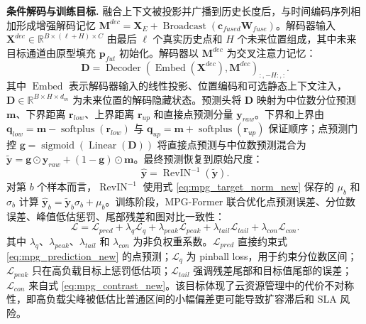\documentclass[UTF8]{ctexart}
\begin{document}
\noindent\textbf{条件解码与训练目标.}
融合上下文被投影并广播到历史长度后，与时间编码序列相加形成增强解码记忆 $\mathbf M^{dec}=\mathbf X_E+\operatorname{Broadcast}(\mathbf c_{fused}\mathbf W_{fuse})$。解码器输入 $\mathbf X^{dec}\in\mathbb R^{B\times(\ell+H)\times C}$ 由最后 $\ell$ 个真实历史点和 $H$ 个未来位置组成，其中未来目标通道由原型填充 $\mathbf p_{fut}$ 初始化。解码器以 $\mathbf M^{dec}$ 为交叉注意力记忆：
\begin{equation}
    \mathbf D=\operatorname{Decoder}(\operatorname{Embed}(\mathbf X^{dec}),\mathbf M^{dec})_{:,-H:,:}.
    \label{eq:mpg_decoder_new}
\end{equation}
其中 $\operatorname{Embed}$ 表示解码器输入的线性投影、位置编码和可选静态上下文注入，$\mathbf D\in\mathbb R^{B\times H\times d_m}$ 为未来位置的解码隐藏状态。预测头将 $\mathbf D$ 映射为中位数分位预测 $\mathbf m$、下界距离 $\mathbf r_{low}$、上界距离 $\mathbf r_{up}$ 和直接点预测分量 $\mathbf y_{raw}$。下界和上界由 $\mathbf q_{low}=\mathbf m-\operatorname{softplus}(\mathbf r_{low})$ 与 $\mathbf q_{up}=\mathbf m+\operatorname{softplus}(\mathbf r_{up})$ 保证顺序；点预测门控 $\mathbf g=\operatorname{sigmoid}(\operatorname{Linear}(\mathbf D))$ 将直接点预测与中位数预测混合为 $\tilde{\mathbf y}=\mathbf g\odot\mathbf y_{raw}+(1-\mathbf g)\odot\mathbf m$。最终预测恢复到原始尺度：
\begin{equation}
    \hat{\mathbf y}=\operatorname{RevIN}^{-1}(\tilde{\mathbf y}).
    \label{eq:mpg_prediction_new}
\end{equation}
对第 $b$ 个样本而言，$\operatorname{RevIN}^{-1}$ 使用式 \eqref{eq:mpg_target_norm_new} 保存的 $\mu_b$ 和 $\sigma_b$ 计算 $\hat{\mathbf y}_b=\tilde{\mathbf y}_b\sigma_b+\mu_b$。训练阶段，MPG-Former 联合优化点预测误差、分位数误差、峰值低估惩罚、尾部残差和图对比一致性：
\begin{equation}
    \mathcal L=\mathcal L_{pred}+\lambda_q\mathcal L_q+\lambda_{peak}\mathcal L_{peak}+\lambda_{tail}\mathcal L_{tail}+\lambda_{con}\mathcal L_{con}.
    \label{eq:mpg_training_loss_new}
\end{equation}
其中 $\lambda_q$、$\lambda_{peak}$、$\lambda_{tail}$ 和 $\lambda_{con}$ 为非负权重系数。$\mathcal L_{pred}$ 直接约束式 \eqref{eq:mpg_prediction_new} 的点预测；$\mathcal L_q$ 为 pinball loss，用于约束分位数区间；$\mathcal L_{peak}$ 只在高负载目标上惩罚低估项；$\mathcal L_{tail}$ 强调残差尾部和目标值尾部的误差；$\mathcal L_{con}$ 来自式 \eqref{eq:mpg_contrast_new}。该目标体现了云资源管理中的代价不对称性，即高负载尖峰被低估比普通区间的小幅偏差更可能导致扩容滞后和 SLA 风险。
\end{document}
